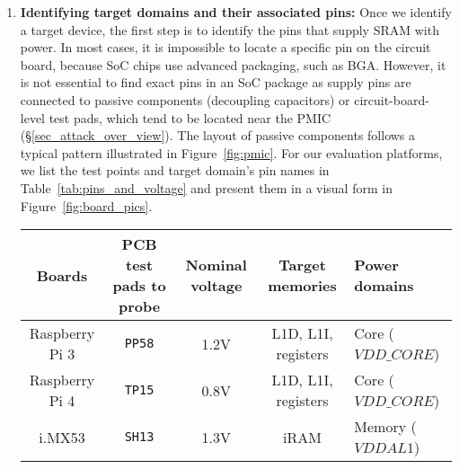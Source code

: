 \begin{enumerate} 
\item \textbf{Identifying target domains and their associated pins:} Once we identify a target device, the first step is to identify the pins that supply SRAM with power. 
In most cases, it is impossible to locate a specific pin on the circuit board, because SoC chips use advanced packaging, such as BGA.  
However, it is not essential to find exact pins in an SoC package as supply pins are connected to passive components (\eg decoupling capacitors) or circuit-board-level test pads, which tend to be located near the PMIC (\S\ref{sec_attack_over_view}).
The layout of passive components follows a typical pattern illustrated in Figure~\ref{fig:pmic}.
For our evaluation platforms, we list the test points and target domain's pin names in Table~\ref{tab:pins_and_voltage} and present them in a visual form in Figure~\ref{fig:board_pics}.

   \begin{table*}
   \centering
\caption{\sys{} evaluation platforms, test pads, and their nominal voltages.}
\label{tab:pins_and_voltage}
\begin{tabular}{ccccl}
\textbf{Boards}  & \textbf{PCB test pads to probe} & \textbf{Nominal voltage} & \textbf{Target memories} & \textbf{Power domains} \\ \toprule[0.3mm] \toprule[0.3mm]
Raspberry Pi  3    & \texttt{PP58}      & 1.2V            & L1D, L1I, registers           & Core ($VDD\_CORE$)     \\
Raspberry Pi  4    & \texttt{TP15}      & 0.8V            & L1D, L1I, registers         & Core ($VDD\_CORE$)     \\
i.MX53 &             \texttt{SH13}      & 1.3V            & iRAM               & Memory ($VDDAL1$)  \\ \hline
\end{tabular}
\end{table*}

 \begin{figure*}
    \centering
    \hfill
    \hfill
    \hfill
    \caption{Pictures of our evaluation platforms (a) Raspberry pi 4,  (b) Raspberry Pi 3, and (c) i.MX535,  showing the test points we attach our voltage probe to.}
    \label{fig:board_pics} 
\end{figure*}


\end{enumerate}
